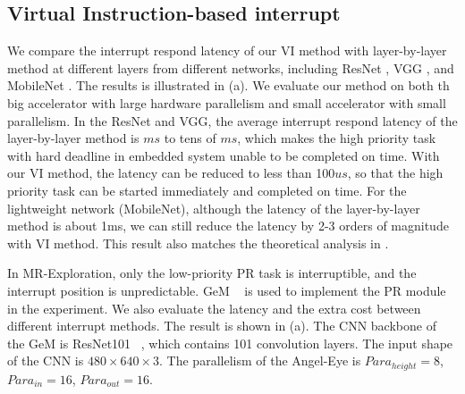 \subsection{Virtual Instruction-based interrupt }

We compare the interrupt respond latency of our VI method with layer-by-layer method at different layers from different networks, including ResNet \cite{he2016deep}, VGG \cite{simonyan2014very}, and MobileNet \cite{howard2017mobilenets}. The results is illustrated in (a). We evaluate our method on both th big accelerator with large hardware parallelism and small accelerator with small parallelism. 
In the ResNet and VGG, the average interrupt respond latency of the layer-by-layer method is $ms$ to tens of $ms$, which makes the high priority task with hard deadline in embedded system unable to be completed on time. With our VI method, the latency can be reduced to less than 100$us$, so that the high priority task can be started immediately and completed on time. 
For the lightweight network (MobileNet), although the latency of the layer-by-layer method is about 1ms, we can still reduce the latency by 2-3 orders of magnitude with VI method. This result also matches the theoretical analysis in .


In MR-Exploration, only the low-priority PR task is interruptible, and the interrupt position is unpredictable. GeM  ~\cite{radenovic2018fine} is used to implement the PR module in the experiment. We also evaluate the latency and the extra cost between different interrupt methods. The result is shown in (a).
The CNN backbone of the GeM is ResNet101  ~\cite{he2016deep}, which contains 101 convolution layers. The input shape of the CNN is $480 \times 640 \times 3$. The parallelism of the Angel-Eye is $Para_{height}=8$, $Para_{in}=16$, $Para_{out}=16$. 

